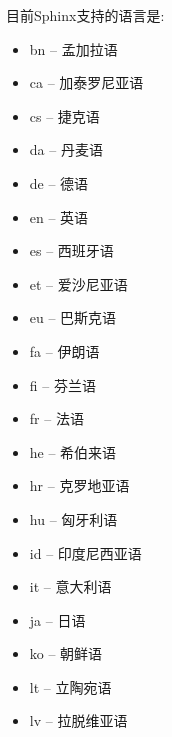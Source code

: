 \documentclass[a4paper,10pt,english]{sphinxmanual}
\begin{document}
\sphinxAtStartPar
目前Sphinx支持的语言是:
\begin{itemize}
\item {} 
\sphinxAtStartPar
bn – 孟加拉语

\item {} 
\sphinxAtStartPar
ca – 加泰罗尼亚语

\item {} 
\sphinxAtStartPar
cs – 捷克语

\item {} 
\sphinxAtStartPar
da – 丹麦语

\item {} 
\sphinxAtStartPar
de – 德语

\item {} 
\sphinxAtStartPar
en – 英语

\item {} 
\sphinxAtStartPar
es – 西班牙语

\item {} 
\sphinxAtStartPar
et – 爱沙尼亚语

\item {} 
\sphinxAtStartPar
eu – 巴斯克语

\item {} 
\sphinxAtStartPar
fa – 伊朗语

\item {} 
\sphinxAtStartPar
fi – 芬兰语

\item {} 
\sphinxAtStartPar
fr – 法语

\item {} 
\sphinxAtStartPar
he – 希伯来语

\item {} 
\sphinxAtStartPar
hr – 克罗地亚语

\item {} 
\sphinxAtStartPar
hu – 匈牙利语

\item {} 
\sphinxAtStartPar
id – 印度尼西亚语

\item {} 
\sphinxAtStartPar
it – 意大利语

\item {} 
\sphinxAtStartPar
ja – 日语

\item {} 
\sphinxAtStartPar
ko – 朝鲜语

\item {} 
\sphinxAtStartPar
lt – 立陶宛语

\item {} 
\sphinxAtStartPar
lv – 拉脱维亚语


\end{itemize}
\end{document}
